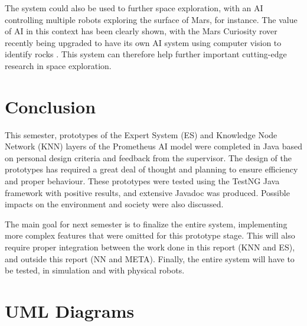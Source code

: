 \documentclass[titlepage,11pt]{article}
\newcommand{\code}[1]{\texttt{#1}}
\begin{document}
The system could also be used to further space exploration, with an AI controlling multiple robots exploring the surface of Mars, for instance. The value of AI in this context has been clearly shown, with the Mars Curiosity rover recently being upgraded to have its own AI system using computer vision to identify rocks \cite{rover}. This system can therefore help further important cutting-edge research in space exploration.

\section{Conclusion}

This semester, prototypes of the Expert System (ES) and Knowledge Node Network (KNN) layers of the Prometheus AI model were completed in Java based on personal design criteria and feedback from the supervisor. The design of the prototypes has required a great deal of thought and planning to ensure efficiency and proper behaviour. These prototypes were tested using the TestNG Java framework with positive results, and extensive Javadoc was produced. Possible impacts on the environment and society were also discussed.

The main goal for next semester is to finalize the entire system, implementing more complex features that were omitted for this prototype stage. This will also require proper integration between the work done in this report (KNN and ES), and outside this report (NN and META). Finally, the entire system will have to be tested, in simulation and with physical robots.

\clearpage
\onecolumn
\appendix

\renewcommand\thefigure{\thesection.\arabic{figure}}
\setcounter{figure}{0}    

\section{UML Diagrams}
\label{sec:uml}




\clearpage

{}

\end{document}
